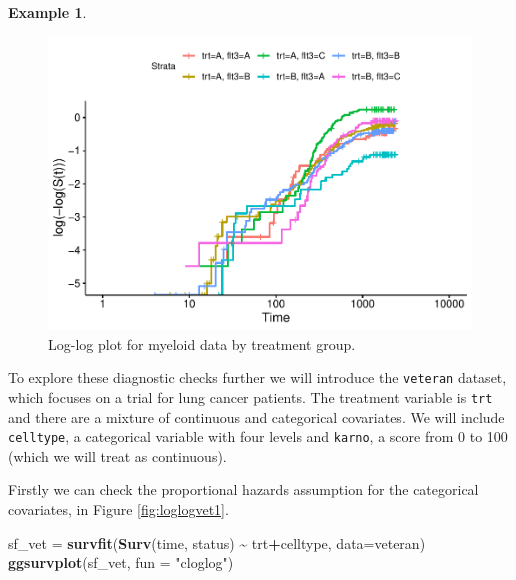 \documentclass[
  openany]{book}
\newenvironment{Shaded}{\begin{snugshade}}{\end{snugshade}}
\newcommand{\AttributeTok}[1]{\textcolor[rgb]{0.13,0.29,0.53}{#1}}
\newcommand{\FunctionTok}[1]{\textcolor[rgb]{0.13,0.29,0.53}{\textbf{#1}}}
\newcommand{\NormalTok}[1]{#1}
\newcommand{\OtherTok}[1]{\textcolor[rgb]{0.56,0.35,0.01}{#1}}
\newcommand{\SpecialCharTok}[1]{\textcolor[rgb]{0.81,0.36,0.00}{\textbf{#1}}}
\newcommand{\StringTok}[1]{\textcolor[rgb]{0.31,0.60,0.02}{#1}}
\theoremstyle{definition}
\theoremstyle{definition}
\newtheorem{example}{Example}[chapter]
\theoremstyle{definition}
\theoremstyle{definition}
\theoremstyle{remark}
\begin{document}
\begin{example}
\begin{figure}
\centering
\includegraphics{CT4H_notes_files/figure-latex/loglogmy2-1.pdf}
\caption{\label{fig:loglogmy2}Log-log plot for myeloid data by treatment group.}
\end{figure}

To explore these diagnostic checks further we will introduce the \texttt{veteran} dataset, which focuses on a trial for lung cancer patients. The treatment variable is \texttt{trt} and there are a mixture of continuous and categorical covariates. We will include \texttt{celltype}, a categorical variable with four levels and \texttt{karno}, a score from 0 to 100 (which we will treat as continuous).

Firstly we can check the proportional hazards assumption for the categorical covariates, in Figure \ref{fig:loglogvet1}.

\begin{Shaded}
\begin{Highlighting}[]
\NormalTok{sf\_vet }\OtherTok{=} \FunctionTok{survfit}\NormalTok{(}\FunctionTok{Surv}\NormalTok{(time, status) }\SpecialCharTok{\textasciitilde{}}\NormalTok{ trt}\SpecialCharTok{+}\NormalTok{celltype, }\AttributeTok{data=}\NormalTok{veteran)}
\FunctionTok{ggsurvplot}\NormalTok{(sf\_vet, }\AttributeTok{fun =} \StringTok{"cloglog"}\NormalTok{)}
\end{Highlighting}
\end{Shaded}


\end{example}
\end{document}
